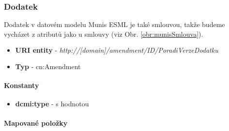 \subsubsection{Dodatek}

Dodatek v datovém modelu Munis ESML je také smlouvou, takže budeme vycházet z atributů jako u smlouvy (viz Obr. \ref{obr:munisSmlouva}).

\begin{itemize}
\item \textbf{URI entity} - \textit{http://[domain]/amendment/{ID}/{PoradiVerzeDodatku}}
\item \textbf{Typ} - cn:Amendment
\end{itemize}

\paragraph*{Konstanty}

\begin{itemize}
\item \textbf{dcmi:type} - s hodnotou 
\end{itemize}

\paragraph*{Mapované položky}

